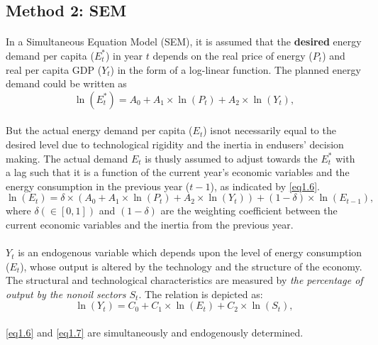 \subsection{Method 2: SEM}
	\paragraph{}{In a Simultaneous Equation Model (SEM), it is assumed that the \textbf{desired} energy demand per capita ($E_t^*$) in year $t$ depends on the real price  of energy ($P_t$) and real per capita GDP ($Y_t$) in the form of a log-linear function. The planned energy demand could be written as
		\begin{equation}\label{eq1.5}
			\ln(E_t^*)=A_0 + A_1 \times \ln(P_t) + A_2 \times \ln(Y_t),
		\end{equation}}
	
	\paragraph{}{But the actual energy demand per capita ($E_t$) isnot necessarily equal to the desired level due to technological rigidity and the inertia in endusers' decision making. The actual demand $E_t$ is thusly assumed to adjust towards the $E_t^*$ with a lag such that it is a function of the current year's economic variables and the energy consumption in the previous year ($t-1$), as indicated by \cref{eq1.6}.
		\begin{equation}\label{eq1.6}
			\ln(E_t)= \delta \times (A_0 + A_1 \times \ln(P_t) + A_2 \times \ln(Y_t)) + (1-\delta) \times \ln(E_{t-1}),
		\end{equation}
	where $\delta(\in [0,1])$ and $(1-\delta)$ are the weighting coefficient between the current economic variables and the inertia from the previous year. 
	}

	\paragraph{}{$Y_t$ is an endogenous variable which depends upon the level of energy consumption ($E_t$), whose output is altered by the technology and the structure of the economy. The structural and technological characteristics are measured by \textit{the percentage of output by the nonoil sectors $S_t$}. The relation is depicted as:
		\begin{equation}\label{eq1.7}
			\ln(Y_t) = C_0 + C_1 \times \ln(E_t) + C_2 \times \ln(S_t),
		\end{equation} \\
	\cref{eq1.6} and \cref{eq1.7} are simultaneously and endogenously determined. 
	}


